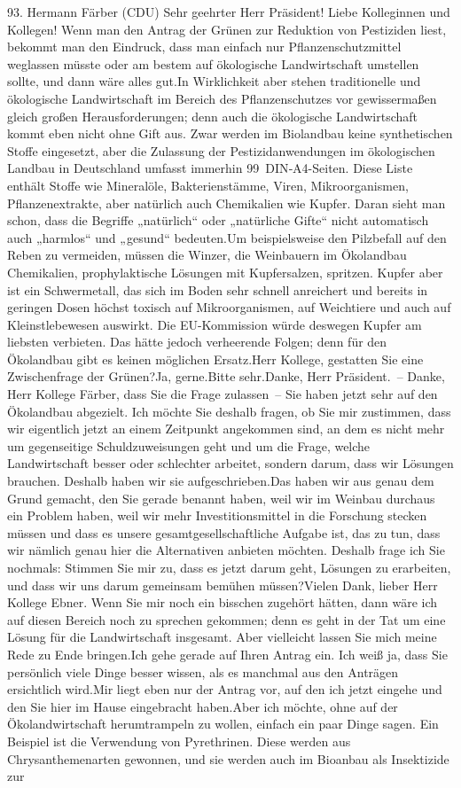 \documentclass{article}
\begin{document}
	93. Hermann Färber (CDU) Sehr geehrter Herr Präsident! Liebe Kolleginnen und Kollegen! Wenn man den Antrag der Grünen zur Reduktion von Pestiziden liest, bekommt man den Eindruck, dass man einfach nur Pflanzenschutzmittel weglassen müsste oder am bestem auf ökologische Landwirtschaft umstellen sollte, und dann wäre alles gut.In Wirklichkeit aber stehen traditionelle und ökologische Landwirtschaft im Bereich des Pflanzenschutzes vor gewissermaßen gleich großen Herausforderungen; denn auch die ökologische Landwirtschaft kommt eben nicht ohne Gift aus. Zwar werden im Biolandbau keine synthetischen Stoffe eingesetzt, aber die Zulassung der Pestizidanwendungen im ökologischen Landbau in Deutschland umfasst immerhin 99 DIN‑A4-Seiten. Diese Liste enthält Stoffe wie Mineralöle, Bakterienstämme, Viren, Mikroorganismen, Pflanzenextrakte, aber natürlich auch Chemikalien wie Kupfer. Daran sieht man schon, dass die Begriffe „natürlich“ oder „natürliche Gifte“ nicht automatisch auch „harmlos“ und „gesund“ bedeuten.Um beispielsweise den Pilzbefall auf den Reben zu vermeiden, müssen die Winzer, die Weinbauern im Ökolandbau Chemikalien, prophylaktische Lösungen mit Kupfersalzen, spritzen. Kupfer aber ist ein Schwermetall, das sich im Boden sehr schnell anreichert und bereits in geringen Dosen höchst toxisch auf Mikroorganismen, auf Weichtiere und auch auf Kleinstlebewesen auswirkt. Die EU-Kommission würde deswegen Kupfer am liebsten verbieten. Das hätte jedoch verheerende Folgen; denn für den Ökolandbau gibt es keinen möglichen Ersatz.Herr Kollege, gestatten Sie eine Zwischenfrage der Grünen?Ja, gerne.Bitte sehr.Danke, Herr Präsident. – Danke, Herr Kollege Färber, dass Sie die Frage zulassen – Sie haben jetzt sehr auf den Ökolandbau abgezielt. Ich möchte Sie deshalb fragen, ob Sie mir zustimmen, dass wir eigentlich jetzt an einem Zeitpunkt angekommen sind, an dem es nicht mehr um gegenseitige Schuldzuweisungen geht und um die Frage, welche Landwirtschaft besser oder schlechter arbeitet, sondern darum, dass wir Lösungen brauchen. Deshalb haben wir sie aufgeschrieben.Das haben wir aus genau dem Grund gemacht, den Sie gerade benannt haben, weil wir im Weinbau durchaus ein Problem haben, weil wir mehr Investitionsmittel in die Forschung stecken müssen und dass es unsere gesamtgesellschaftliche Aufgabe ist, das zu tun, dass wir nämlich genau hier die Alternativen anbieten möchten. Deshalb frage ich Sie nochmals: Stimmen Sie mir zu, dass es jetzt darum geht, Lösungen zu erarbeiten, und dass wir uns darum gemeinsam bemühen müssen?Vielen Dank, lieber Herr Kollege Ebner. Wenn Sie mir noch ein bisschen zugehört hätten, dann wäre ich auf diesen Bereich noch zu sprechen gekommen; denn es geht in der Tat um eine Lösung für die Landwirtschaft insgesamt. Aber vielleicht lassen Sie mich meine Rede zu Ende bringen.Ich gehe gerade auf Ihren Antrag ein. Ich weiß ja, dass Sie persönlich viele Dinge besser wissen, als es manchmal aus den Anträgen ersichtlich wird.Mir liegt eben nur der Antrag vor, auf den ich jetzt eingehe und den Sie hier im Hause eingebracht haben.Aber ich möchte, ohne auf der Ökolandwirtschaft herumtrampeln zu wollen, einfach ein paar Dinge sagen. Ein Beispiel ist die Verwendung von Pyrethrinen. Diese werden aus Chrysanthemenarten gewonnen, und sie werden auch im Bioanbau als Insektizide zur 
\end{document}
